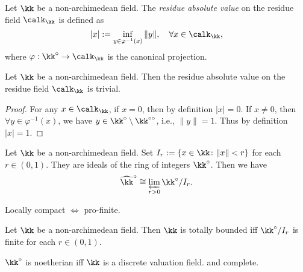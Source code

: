     \begin{definition}\label{def:residue_absolute_value_on_residue_fields}
        Let \(\kk\) be a non-archimedean field.
        The \emph{residue absolute value} on the residue field \(\calk_\kk\) is defined as
        \[ |x| := \inf_{y \in \varphi^{-1}(x)} \|y\|, \quad \forall x \in \calk_\kk, \]
        where \(\varphi: \kk^\circ \to \calk_\kk\) is the canonical projection.
    \end{definition}

    \begin{proposition}\label{prop:residue_absolute_value_on_residue_fields_is_trivial}
        Let \(\kk\) be a non-archimedean field.
        Then the residue absolute value on the residue field \(\calk_\kk\) is trivial.
    \end{proposition}
    \begin{proof}
        For any \(x \in \calk_\kk\), if \(x = 0\), then by definition \(|x| = 0\).
        If \(x \neq 0\), then \(\forall y \in \varphi^{-1}(x)\), we have \(y \in \kk^\circ \setminus \kk^{\circ\circ}\), i.e., \(\|y\| = 1\).
        Thus by definition \(|x| = 1\).
    \end{proof}



    \begin{proposition}\label{prop:recover_complete_non-archimedean_fields_from_projective_limits}
        Let \(\kk\) be a non-archimedean field.
        Set \(I_r := \{x \in \kk\colon \|x\| < r\}\) for each \(r \in (0,1)\).
        They are ideals of the ring of integers \(\kk^\circ\).
        Then we have 
        \[ \widehat{\kk}^\circ \cong \varprojlim_{r > 0} \kk^\circ / I_r. \]
    \end{proposition}

    \begin{slogan}
        Locally compact \(\iff\) pro-finite.
    \end{slogan}

    \begin{proposition}\label{prop:locally_compact_NA_field_iff_it_is_pro-finite}
        Let \(\kk\) be a non-archimedean field.
        Then \(\kk\) is totally bounded iff \(\kk^\circ / I_r\) is finite for each \(r \in (0,1)\).
    \end{proposition}

    \begin{proposition}\label{prop:}
        \(\kk^\circ\) is noetherian iff \(\kk\) is a discrete valuation field.
        and complete.
    \end{proposition}


